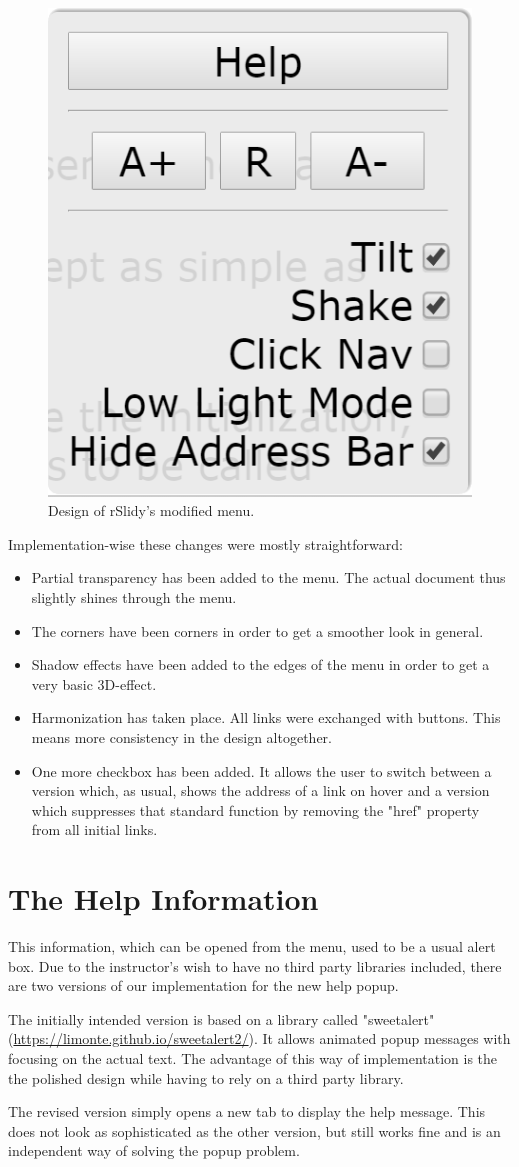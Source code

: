 \begin{figure}[tp]
	\centering
	\includegraphics[width = .4\textwidth]{images/menu_new.png}
	
	\caption[Modified Menu]{
		Design of rSlidy's modified menu.
	}
	\label{fig:menuNEW}
\end{figure}

Implementation-wise these changes were mostly straightforward:
\begin{itemize}
	\item Partial transparency has been added to the menu. The actual document thus slightly shines through the menu.
	\item The corners have been corners in order to get a smoother look in general.
	\item Shadow effects have been added to the edges of the menu in order to get a very basic 3D-effect.
	\item Harmonization has taken place. All links were exchanged with buttons. This means more consistency in the design altogether. 
	\item One more checkbox has been added. It allows the user to switch between a version which, as usual, shows the address of a link on hover and a version which suppresses that standard function by removing the "href" property from all initial links.
\end{itemize}


\section{The Help Information}
This information, which can be opened from the menu, used to be a usual alert box. Due to the instructor's wish to have no third party libraries included, there are two versions of our implementation for the new help popup.

The initially intended version is based on a library called "sweetalert" (\url{https://limonte.github.io/sweetalert2/}). It allows animated popup messages with focusing on the actual text. The advantage of this way of implementation is the the polished design while having to rely on a third party library. 

The revised version simply opens a new tab to display the help message. This does not look as sophisticated as the other version, but still works fine and is an independent way of solving the popup problem.
